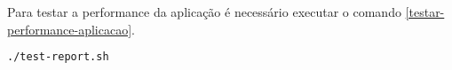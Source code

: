Para testar a performance da aplicação é necessário executar o comando
\autoref{testar-performance-aplicacao}.

\begin{lstlisting}[language=bash,label=testar-performance-aplicacao,caption=Como testar a performance da aplicação]
./test-report.sh
\end{lstlisting}






